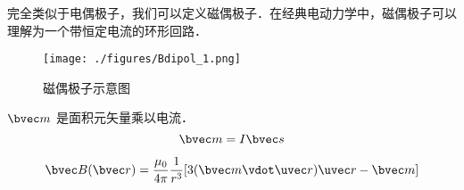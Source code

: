 
\begin{issues}
\issueDraft
\end{issues}
完全类似于电偶极子，我们可以定义磁偶极子．在经典电动力学中，磁偶极子可以理解为一个带恒定电流的环形回路．
\begin{figure}[ht]
\centering
\texttt{[image: ./figures/Bdipol\_1.png]}
\caption{磁偶极子示意图} \label{Bdipol_fig1}
\end{figure}


$\bvec m$ 是面积元矢量乘以电流．
\begin{equation}
\bvec m = I \bvec s
\end{equation}

\begin{equation}
\bvec B(\bvec r) = \frac{\mu_0}{4\pi} \frac{1}{r^3} [3(\bvec m \vdot \uvec r) \uvec r - \bvec m]
\end{equation}
